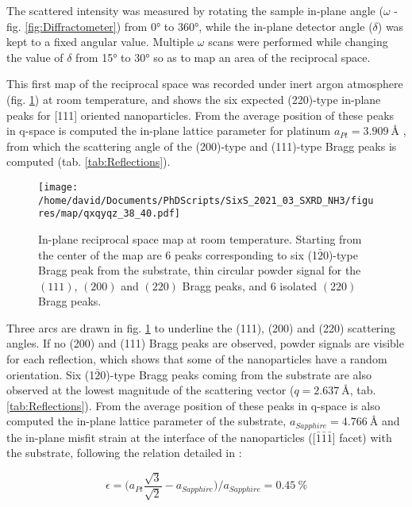 The scattered intensity was measured by rotating the sample in-plane angle ($\omega$ - fig. \ref{fig:Diffractometer}) from \ang{0} to \ang{360}, while the in-plane detector angle ($\delta$) was kept to a fixed angular value.
Multiple $\omega$ scans were performed while changing the value of $\delta$ from \ang{15} to \ang{30} so as to map an area of the reciprocal space.

This first map of the reciprocal space was recorded under inert argon atmosphere (fig. \ref{fig:QxQyMap}) at room temperature, and shows the six expected (220)-type in-plane peaks for [111] oriented nanoparticles.
From the average position of these peaks in q-space is computed the in-plane lattice parameter for platinum $a_{Pt}=\qty{3.909}{\angstrom}$
, from which the scattering angle of the (200)-type and (111)-type Bragg peaks is computed (tab. \ref{tab:Reflections}).

\begin{figure}[!htb]
    \centering
    \texttt{[image: /home/david/Documents/PhDScripts/SixS\_2021\_03\_SXRD\_NH3/figures/map/qxqyqz\_38\_40.pdf]}
    \caption{
        In-plane reciprocal space map at room temperature.
        Starting from the center of the map are 6 peaks corresponding to six (1$\bar{2}$0)-type Bragg peak from the substrate, thin circular powder signal for the $(111)$, $(200)$ and $(220)$ Bragg peaks, and 6 isolated $(220)$ Bragg peaks.
    }
    \label{fig:QxQyMap}
\end{figure}

Three arcs are drawn in fig. \ref{fig:QxQyMap} to underline the (111), (200) and (220) scattering angles.
If no (200) and (111) Bragg peaks are observed, powder signals are visible for each reflection, which shows that some of the nanoparticles have a random orientation.
Six (1$\bar{2}$0)-type Bragg peaks coming from the  substrate are also observed at the lowest magnitude of the scattering vector ($q = \qty{2.637}{\angstrom}$, tab. \ref{tab:Reflections}).
From the average position of these peaks in q-space is also computed the in-plane lattice parameter of the substrate, $a_{Sapphire}=\qty{4.766}{\angstrom}$ and the in-plane misfit strain at the interface of the nanoparticles ([$\bar{1}\bar{1}\bar{1}$] facet) with the substrate, following the relation detailed in \cite{Farrow1993}:

\begin{equation}
    \epsilon = \big( a_{Pt} \frac{\sqrt{3}}{\sqrt{2}} - a_{Sapphire} \big) / a_{Sapphire} = \qty{0.45}{\percent}
    \label{eq:MisfitStrain}
\end{equation}

